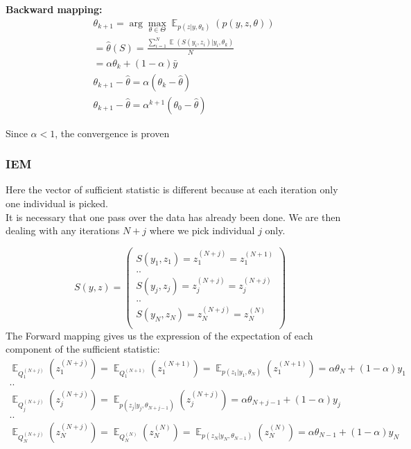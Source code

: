 \documentclass[a4paper]{article}
\theoremstyle{plain}
\DeclareMathOperator*{\E}{\mathbb{E}}
\theoremstyle{plain}
\theoremstyle{definition}
\begin{document}
\noindent \textbf{Backward mapping:}
\begin{equation}
\begin{split}
& \theta_{k+1} = \arg \max \limits_{\theta \in \Theta} \E_{p(z|y,\theta_k)}(p(y,z,\theta))\\
& = \hat{\theta}(S) = \frac{\sum_{i=1}^{N}{\E{(S(y_i,z_i)|y_i,\theta_{k})}}}{N}\\
& = \alpha \theta_{k} + (1-\alpha)\bar{y}\\
& \theta_{k+1} - \hat{\theta} = \alpha (\theta_{k} - \hat{\theta})\\
& \theta_{k+1} - \hat{\theta} = \alpha^{k+1} (\theta_{0} - \hat{\theta})
\end{split}
\end{equation}

Since $\alpha < 1$, the convergence is proven

\subsubsection{IEM}
Here the vector of sufficient statistic is different because at each iteration only one individual is picked.\\
It is necessary that one pass over the data has already been done. We are then dealing with any iterations $N+j$ where we pick individual $j$ only.

\begin{equation}
S(y,z) = 
\left(
\begin{array}{c}
S(y_1,z_1) =z_1^{(N+j)}= z_1^{(N+1)}\\
..\\
S(y_j,z_j) =z_j^{(N+j)}= z_j^{(N+j)}\\
..\\
S(y_N,z_N) =z_N^{(N+j)}= z_N^{(N)}\\
\end{array}
\right)
\end{equation}
\noindent The Forward mapping gives us the expression of the expectation of each component of the sufficient statistic:
\begin{equation}
\begin{matrix} 
\E_{Q_1^{(N+j)}}(z_1^{(N+j)})= \E_{Q_1^{(N+1)}}(z_1^{(N+1)})=\E_{p(z_1|y_1,\theta_N)}(z_1^{(N+1)}) = \alpha \theta_{N} + (1-\alpha)y_1\\
..\\
\E_{Q_j^{(N+j)}}(z_j^{(N+j)})=\E_{p(z_j|y_j,\theta_{N+j-1})}(z_j^{(N+j)})= \alpha \theta_{N+j-1} + (1-\alpha)y_j\\
..\\
\E_{Q_N^{(N+j)}}(z_N^{(N+j)})= \E_{Q_N^{(N)}}(z_N^{(N)})=\E_{p(z_N|y_N,\theta_{N-1})}(z_N^{(N)}) = \alpha \theta_{N-1} + (1-\alpha)y_N
\end{matrix}
\end{equation}
\end{document}

